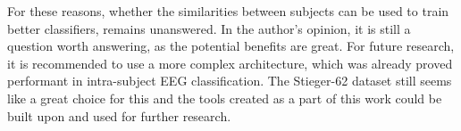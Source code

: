 \documentclass[english, he, bc, kiv, iso690alph, viewonly]{fasthesis}
\begin{document}
For these reasons, whether the similarities between subjects can be used to train better classifiers, remains unanswered. In the author's opinion, it is still a question worth answering, as the potential benefits are great. For future research, it is recommended to use a more complex architecture, which was already proved performant in intra-subject EEG classification. The Stieger-62 dataset still seems like a great choice for this and the tools created as a part of this work could be built upon and used for further research.


\backmatter
\printbibliography
\listoffigures
\listoftables
\listoflistings

\setbackpageqrcode
\backpage
\end{document}
